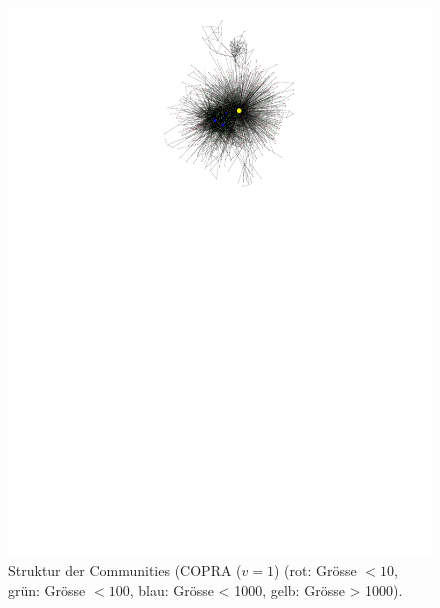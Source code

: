 \begin{figure}[h]
  \centering
  \includegraphics[scale=2]{images/metagraph-copra1-minsize5.pdf}
  \caption{Struktur der Communities (COPRA ($v=1$) (rot: Gr\"osse
    $<10$, gr\"un: Gr\"osse $<100$, blau: Gr\"osse < 1000, gelb:
    Gr\"osse > 1000).}
  \label{fig:metagraph-com-copra}
\end{figure}

